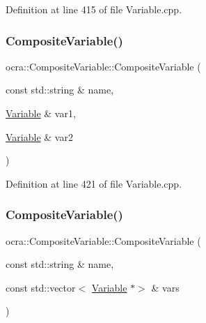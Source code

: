 Definition at line 415 of file Variable.\+cpp.

\hypertarget{classocra_1_1CompositeVariable_a7dce5cb02821d4da44f606a45407e0ae}{}\label{classocra_1_1CompositeVariable_a7dce5cb02821d4da44f606a45407e0ae} 
\subsubsection{\texorpdfstring{Composite\+Variable()}{CompositeVariable()}\hspace{0.1cm}{\footnotesize\ttfamily [3/4]}}
{\footnotesize\ttfamily ocra\+::\+Composite\+Variable\+::\+Composite\+Variable (\begin{DoxyParamCaption}\item[{const std\+::string \&}]{name,  }\item[{\hyperlink{classocra_1_1Variable}{Variable} \&}]{var1,  }\item[{\hyperlink{classocra_1_1Variable}{Variable} \&}]{var2 }\end{DoxyParamCaption})}



Definition at line 421 of file Variable.\+cpp.

\hypertarget{classocra_1_1CompositeVariable_a80c80db8037f36c9ac84a9b03171013f}{}\label{classocra_1_1CompositeVariable_a80c80db8037f36c9ac84a9b03171013f} 
\subsubsection{\texorpdfstring{Composite\+Variable()}{CompositeVariable()}\hspace{0.1cm}{\footnotesize\ttfamily [4/4]}}
{\footnotesize\ttfamily ocra\+::\+Composite\+Variable\+::\+Composite\+Variable (\begin{DoxyParamCaption}\item[{const std\+::string \&}]{name,  }\item[{const std\+::vector$<$ \hyperlink{classocra_1_1Variable}{Variable} $\ast$$>$ \&}]{vars }\end{DoxyParamCaption})}



